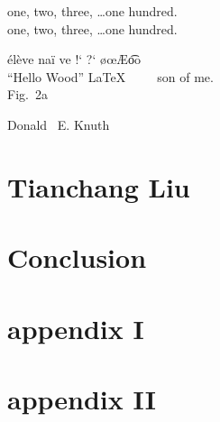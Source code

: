 \documentclass[11pt,oneside,a4paper]{article}
\begin{document}
            one, two, three, \dots one hundred.\\
            one, two, three, \ldots one hundred.

            \'el\`eve na\"i ve !` ?` \o \oe \AE \t{oo} \textregistered \texttrademark\\

            ``Hello Wood'' \LaTeX \ \ \ \ \ son of me. \\


            Fig.~2a \par
            Donald ~E. Knuth \par
\section{Tianchang Liu}
\section{Conclusion}

\appendix
\section{appendix I}
\section{appendix II}
\end{document}
